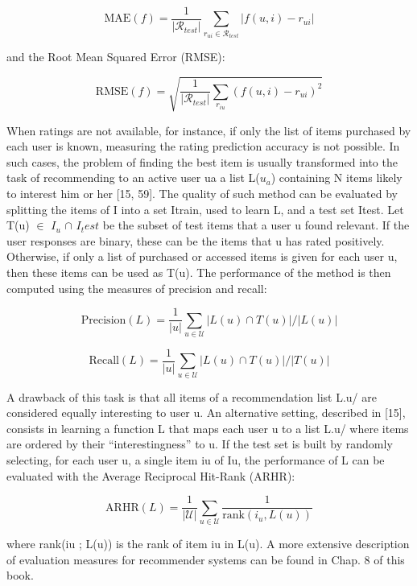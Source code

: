 $$
\mathrm { MAE } ( f ) = \frac { 1 } { \left| \mathcal { R } _ {test} \right| } \sum _ { r _ { u i } \in \mathcal { R } _ {test} } \left| f ( u , i ) - r _ { u i } \right|
$$

and the Root Mean Squared Error (RMSE):

$$
\mathrm { RMSE } ( f ) = \sqrt { \frac { 1 } { \left| \mathcal { R } _ { test} \right| } \sum _ { r _ { i u } } \left( f ( u , i ) - r _ { u i } \right) ^ { 2 } }
$$

When ratings are not available, for instance, if only the list of items purchased by each user is known, measuring the rating prediction accuracy is not possible. In such cases, the problem of finding the best item is usually transformed into the task of recommending to an active user ua a list L($u_a$) containing N items likely to interest him or her [15, 59]. The quality of such method can be evaluated by splitting the items of I into a set Itrain, used to learn L, and a test set Itest. Let  T(u) $\in$ $I_u$ $\cap$ $I_test$ be the subset of test items that a user u found relevant. If the user responses are binary, these can be the items that u has rated positively. Otherwise, if only a list of purchased or accessed items is given for each user u, then these items can be used as T(u). The performance of the method is then computed using the measures of precision and recall:

$$
\mathrm { Precision } ( L ) = \frac { 1 } { | u | } \sum _ { u \in \mathcal { U } } | L ( u ) \cap T ( u ) | / | L ( u ) |
$$


$$
\mathrm { Recall } ( L ) = \frac { 1 } { | u | } \sum _ { u \in \mathcal { U } } | L ( u ) \cap T ( u ) | / | T ( u ) |
$$

A drawback of this task is that all items of a recommendation list L.u/ are considered equally interesting to user u. An alternative setting, described in [15], consists in learning a function L that maps each user u to a list L.u/ where items are ordered by their “interestingness” to u. If the test set is built by randomly selecting, for each user u, a single item iu of Iu, the performance of L can be evaluated with the Average Reciprocal Hit-Rank (ARHR):

$$
\mathrm { ARHR } ( L ) = \frac { 1 } { | \mathcal { U } | } \sum _ { u \in \mathcal { U } } \frac { 1 } { \mathrm { rank } \left( i _ { u } , L ( u ) \right) }
$$

where rank(iu ; L(u)) is the rank of item iu in L(u). A more extensive description of evaluation measures for recommender systems can be found in Chap. 8 of this book.


